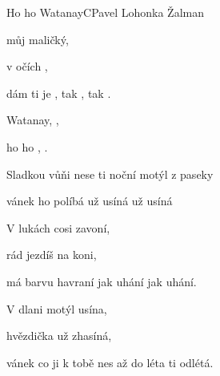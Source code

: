 \begin{song}{Ho ho Watanay}{C}{Pavel Lohonka Žalman}

\begin{SBVerse}

 můj maličký,

 v očích ,

dám ti je , tak , tak .

\end{SBVerse}

\begin{SBChorus}

 Watanay,  ,

ho ho ,  .

\end{SBChorus}

\begin{SBVerse}

Sladkou vůňi nese ti noční motýl z paseky

vánek ho políbá už usíná už usíná

\end{SBVerse}

\begin{SBChorus}

\end{SBChorus}

\begin{SBVerse}

V lukách cosi zavoní,

rád jezdíš na koni,

má barvu havraní jak uhání jak uhání.

\end{SBVerse}

\begin{SBChorus}

\end{SBChorus}

\begin{SBVerse}

V dlani motýl usína,

hvězdička už zhasíná,

vánek co ji k tobě nes až do léta ti odlétá.

\end{SBVerse}

\begin{SBChorus}

\end{SBChorus}

\end{song}

\clearpage
